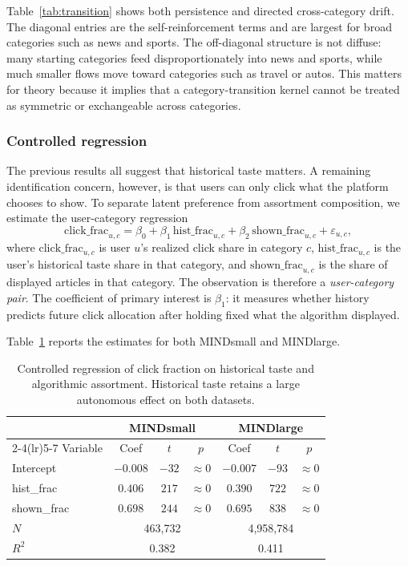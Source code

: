 \documentclass[11pt]{article}
\begin{document}
Table~\ref{tab:transition} shows both persistence and directed cross-category drift. The diagonal entries are the self-reinforcement terms and are largest for broad categories such as news and sports. The off-diagonal structure is not diffuse: many starting categories feed disproportionately into news and sports, while much smaller flows move toward categories such as travel or autos. This matters for theory because it implies that a category-transition kernel cannot be treated as symmetric or exchangeable across categories.

\subsubsection{Controlled regression}
\label{sec:regression}

The previous results all suggest that historical taste matters. A remaining identification concern, however, is that users can only click what the platform chooses to show. To separate latent preference from assortment composition, we estimate the user-category regression
\[
\text{click\_frac}_{u,c}
=
\beta_0
+
\beta_1\,\text{hist\_frac}_{u,c}
+
\beta_2\,\text{shown\_frac}_{u,c}
+
\varepsilon_{u,c},
\]
where $\text{click\_frac}_{u,c}$ is user $u$'s realized click share in category $c$, $\text{hist\_frac}_{u,c}$ is the user's historical taste share in that category, and $\text{shown\_frac}_{u,c}$ is the share of displayed articles in that category. The observation is therefore a \emph{user-category pair}. The coefficient of primary interest is $\beta_1$: it measures whether history predicts future click allocation after holding fixed what the algorithm displayed.

Table~\ref{tab:controlled_reg} reports the estimates for both MINDsmall and MINDlarge.

\begin{table}[ht]
\centering
\caption{Controlled regression of click fraction on historical taste and algorithmic assortment. Historical taste retains a large autonomous effect on both datasets.}
\label{tab:controlled_reg}
\begin{tabular}{lcccccc}
\toprule
 & \multicolumn{3}{c}{MINDsmall} & \multicolumn{3}{c}{MINDlarge} \\
\cmidrule(lr){2-4}\cmidrule(lr){5-7}
Variable & Coef & $t$ & $p$ & Coef & $t$ & $p$ \\
\midrule
Intercept & $-0.008$ & $-32$ & $\approx 0$ & $-0.007$ & $-93$ & $\approx 0$ \\
hist\_frac & $0.406$ & $217$ & $\approx 0$ & $0.390$ & $722$ & $\approx 0$ \\
shown\_frac & $0.698$ & $244$ & $\approx 0$ & $0.695$ & $838$ & $\approx 0$ \\
\midrule
$N$ & \multicolumn{3}{c}{463,732} & \multicolumn{3}{c}{4,958,784} \\
$R^2$ & \multicolumn{3}{c}{0.382} & \multicolumn{3}{c}{0.411} \\
\bottomrule
\end{tabular}
\end{table}
\FloatBarrier
\end{document}
